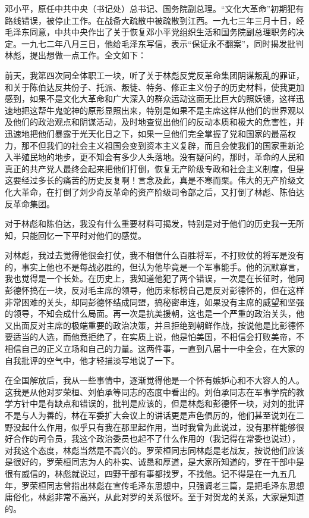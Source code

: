 \begin{maonote}
邓小平，原任中共中央（书记处）总书记、国务院副总理。“文化大革命”初期犯有路线错误，被停止工作。在战备大疏散中被疏散到江西。一九七三年三月十日，经毛泽东同意，中共中央作出了关于恢复邓小平党组织生活和国务院副总理职务的决定。一九七二年八月三日，他给毛泽东写信，表示“保证永不翻案”，同时揭发批判林彪，提出想做一点工作。全文如下：


前天，我第四次同全体职工一块，听了关于林彪反党反革命集团阴谋叛乱的罪证，和关于陈伯达反共份子、托派、叛徒、特务、修正主义份子的历史材料，使我更加感到，如果不是文化大革命和广大深入的群众运动这面无比巨大的照妖镜，这样迅速地把这帮牛鬼蛇神的原形显照出来，特别是如果不是主席这样从他们的世界观以及他们的政治观点和阴谋活动，及时地查觉出他们的反动本质和极大的危害性，并迅速地把他们暴露于光天化日之下，如果一旦他们完全掌握了党和国家的最高权力，那不但我们的社会主义祖国会变到资本主义复辟，而且会使我们的国家重新沦入半殖民地的地步，更不知会有多少人头落地。没有疑问的，那时，革命的人民和真正的共产党人最终会起来把他们打倒，恢复无产阶级专政和社会主义制度，但是这要经过多长的痛苦的历史反复啊！言念及此，真是不寒而栗。伟大的无产阶级文化大革命，在打倒了刘少奇反革命的资产阶级司令部之后，又打倒了林彪、陈伯达反革命集团。

对于林彪和陈伯达，我没有什么重要材料可揭发，特别是对于他们的历史我一无所知，只能回忆一下平时对他们的感觉。

对林彪，我过去觉得他很会打仗，我不相信什么百胜将军，不打败仗的将军是没有的，事实上他也不是每战必胜的，但认为他毕竟是一个军事能手。他的沉默寡言，我也觉得是一个长处。在历史上，我知道他犯了两个错误，一次是在长征时，他同彭德怀搞在一块，反对毛主席的领导，他历来标榜自己是反对彭德怀的，但在这样非常困难的关头，却同彭德怀结成同盟，搞秘密串连，如果没有主席的威望和坚强的领导，不知会成什么局面。再一次是抗美援朝，这也是一个严重的政治关头，他又出面反对主席的极端重要的政治决策，并且拒绝到朝鲜作战，按说他是比彭德怀要适当的人选，而他竟拒绝了，在实质上说，他是怕美国，不相信会打败美帝，不相信自己的正义立场和自己的力量。这两件事，一直到八届十一中全会，在大家的自我批评的空气中，他才轻描淡写地说了一下。

在全国解放后，我从一些事情中，逐渐觉得他是一个怀有嫉妒心和不大容人的人。这我是从他对罗荣桓、刘伯承等同志的态度中看出的。刘伯承同志在军事学院的教学方针中是有缺点和错误的，批判是应该的，但是林彪和彭德怀一块，对刘的批评不是与人为善的，林在军委扩大会议上的讲话更是声色俱厉的，他们甚至说刘在二野没起什么作用，似乎只有我在那里起作用，当时我曾为此说过，没有那样能够很好合作的司令员，我这个政治委员也起不了什么作用的（我记得在常委也说过），对我这个态度，林彪当然是不高兴的。罗荣桓同志同林彪是老战友，按说他们应该是很好的，罗荣桓同志为人的朴实、诚恳和厚道，是大家所知道的，罗在干部中是很有威信的，林彪就说过，四野干部有事都找罗，不找他。记不得是在一九五几年，罗荣桓同志曾指出林彪在宣传毛泽东思想中，只强调老三篇，是把毛泽东思想庸俗化，林彪非常不高兴，从此对罗的关系很坏。至于对贺龙的关系，大家是知道的。


\end{maonote}
